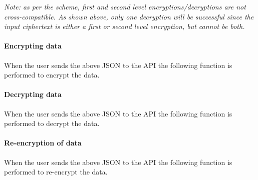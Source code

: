 



\textit{Note: as per the \cite{afgh:2006:article} scheme, first and second level encryptions/decryptions are not cross-compatible. As shown above, only one decryption will be successful since the input ciphertext is either a first or second level encryption, but cannot be both.}

\paragraph{Encrypting data}



When the user sends the above JSON to the API the following function is performed to encrypt the data.



\paragraph{Decrypting data}



When the user sends the above JSON to the API the following function is performed to decrypt the data.



\paragraph{Re-encryption of data}



When the user sends the above JSON to the API the following function is performed to re-encrypt the data.



